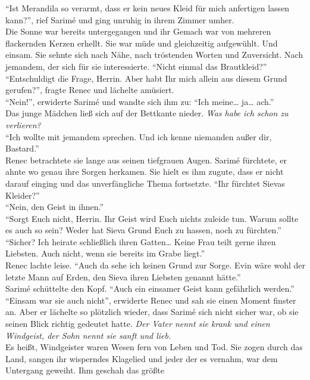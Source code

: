 ``Ist Merandila so verarmt, dass er kein neues Kleid für mich anfertigen lassen kann?'', rief 
Sarimé und ging unruhig in ihrem Zimmer umher.\\ 
Die Sonne war bereits untergegangen und ihr Gemach war von mehreren flackernden Kerzen erhellt. Sie 
war müde und gleichzeitig aufgewühlt. Und einsam. Sie sehnte sich nach Nähe, nach tröstenden Worten 
und Zuversicht. Nach jemandem, der sich für sie interessierte. ``Nicht einmal das Brautkleid?''\\
``Entschuldigt die Frage, Herrin. Aber habt Ihr mich allein aus diesem Grund gerufen?'', fragte 
Renec und lächelte amüsiert.\\
``Nein!'', erwiderte Sarimé und wandte sich ihm zu: ``Ich meine… ja… ach.''\\
Das junge Mädchen ließ sich auf der Bettkante nieder. \textit{Was habe ich schon zu verlieren?} \\
``Ich wollte mit jemandem sprechen. Und ich kenne niemanden außer dir, Bastard.''\\
Renec betrachtete sie lange aus seinen tiefgrauen Augen. Sarimé fürchtete, er ahnte wo genau ihre 
Sorgen herkamen. Sie hielt es ihm zugute, dass er nicht darauf einging und das unverfängliche 
Thema fortsetzte. ``Ihr fürchtet Sievas Kleider?''\\
``Nein, den Geist in ihnen.''\\
``Sorgt Euch nicht, Herrin. Ihr Geist wird Euch nichts zuleide tun. Warum sollte es auch so sein? 
Weder hat Sieva Grund Euch zu hassen, noch zu fürchten.''\\
``Sicher? Ich heirate schließlich ihren Gatten… Keine Frau teilt gerne ihren Liebsten. Auch nicht, 
wenn sie bereits im Grabe liegt.''\\
Renec lachte leise. ``Auch da sehe ich keinen Grund zur Sorge. Evin wäre wohl der letzte Mann auf 
Erden, den Sieva ihren Liebsten genannt hätte.''\\
Sarimé schüttelte den Kopf. ``Auch ein einsamer Geist kann gefährlich werden.''\\
``Einsam war sie auch nicht'', erwiderte Renec und sah sie einen Moment finster an. Aber er 
lächelte so plötzlich wieder, dass Sarimé sich nicht sicher war, ob sie seinen Blick richtig 
gedeutet hatte.
\textit{Der Vater nennt sie krank und einen Windgeist, der Sohn nennt sie sanft und lieb.}\\
Es heißt, Windgeister waren Wesen fern von Leben und Tod. Sie zogen durch das Land, sangen ihr 
wisperndes Klagelied und jeder der es vernahm, war dem Untergang geweiht. Ihm geschah das größte 
